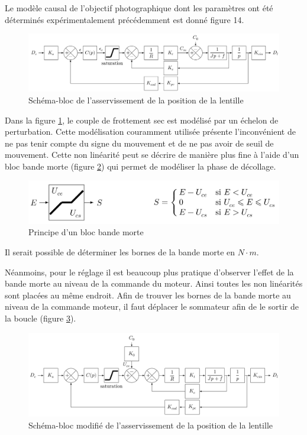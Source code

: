 Le modèle causal de l'objectif photographique dont les paramètres ont été déterminés expérimentalement précédemment est donné figure 14.

\begin{figure}[!h]
\centering\includegraphics[width=0.9\linewidth]{img/figure_14}
 \caption{Schéma-bloc de l'asservissement de la position de la lentille}
 \label{img14}
\end{figure}

Dans la figure \ref{img14}, le couple de frottement sec est modélisé par un échelon de perturbation. Cette modélisation couramment utilisée présente l'inconvénient de ne pas tenir compte du signe du mouvement et de ne pas avoir de seuil de mouvement. Cette non linéarité peut se décrire de manière plus fine à l'aide d'un bloc bande morte
(figure \ref{img15}) qui permet de modéliser la phase de décollage.

\begin{figure}[!h]
\centering\includegraphics[width=0.6\linewidth]{img/figure_15}
 \caption{Principe d'un bloc bande morte}
 \label{img15}
\end{figure}


Il serait possible de déterminer les bornes de la bande morte en $N\cdot m$. 

Néanmoins, pour le réglage il est beaucoup plus pratique d'observer l'effet de la bande morte au niveau de la commande du moteur. Ainsi toutes les non linéarités sont placées au même endroit. Afin de trouver les bornes de la bande morte au niveau de la commande moteur, il faut déplacer le sommateur afin de le sortir de la boucle (figure \ref{img16}).

\begin{figure}[!h]
\centering\includegraphics[width=0.9\linewidth]{img/figure_16}
 \caption{Schéma-bloc modifié de l'asservissement de la position de la lentille}
 \label{img16}
\end{figure}

